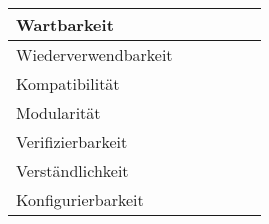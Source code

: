 \begin{center}
\begin{longtable}{|l|c|c|c|c|c|}
		\hline

		Wartbarkeit &  &  &  &  &  \\
		
		\hline

		Wiederverwendbarkeit &  &  &  &  &  \\
		
		\hline

		Kompatibilität &  &  &  &  &  \\
		
		\hline

		Modularität &  &  &  &  &  \\
		
		\hline

		Verifizierbarkeit &  &  &  &  &  \\
		
		\hline

		Verständlichkeit &  &  &  &  &  \\
		
		\hline

		Konfigurierbarkeit &  &  &  &  &  \\
		
		\hline
	
	\end{longtable}

\end{center}
